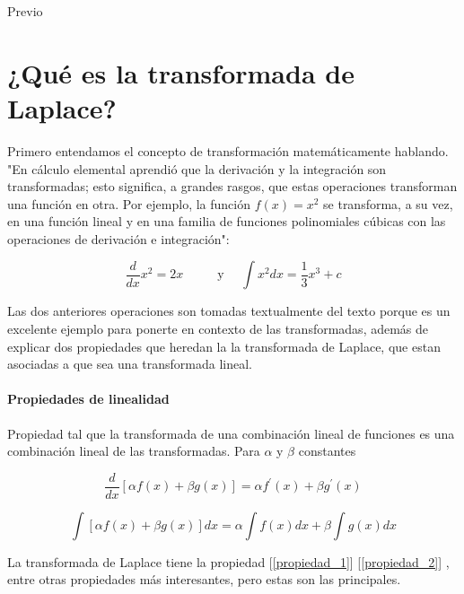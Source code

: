 {\Huge Previo }

\noindent \justifying
\noindent

\section{¿Qué es la transformada de Laplace?}

Primero entendamos el concepto de transformación matemáticamente hablando.
"En cálculo elemental aprendió que la derivación y la integración son transformadas; esto significa, a grandes rasgos, que estas operaciones transforman una función en otra. Por ejemplo, la función $f(x)=x^{2}$ se transforma, a su vez, en una función lineal y en una familia de funciones polinomiales cúbicas con las operaciones de derivación e integración":


\begin{equation}
		\frac{d}{d x} x^{2}=2 x \hspace{1cm}
		\text { y } \quad \int x^{2} d x=\frac{1}{3} x^{3}+c
\end{equation}

Las dos anteriores operaciones son   tomadas textualmente del texto  porque es un excelente ejemplo para ponerte en contexto de las transformadas, además de explicar dos propiedades que heredan la la transformada de Laplace, que estan asociadas a que sea una transformada lineal.

\paragraph*{Propiedades de linealidad}

Propiedad  tal que la transformada de una combinación lineal de funciones es una combinación lineal de las transformadas. Para $\alpha$ y $\beta$ constantes

\begin{equation}
	\frac{d}{d x}[\alpha f(x)+\beta g(x)]=\alpha f^{\prime}(x)+\beta g^{\prime}(x)
	\label{propiedad_1}
\end{equation}

\begin{equation}
	\int[\alpha f(x)+\beta g(x)] d x=\alpha \int f(x) d x+\beta \int g(x) d x
	\label{propiedad_2}
\end{equation}

La transformada de Laplace tiene la propiedad [\ref{propiedad_1}] [\ref{propiedad_2}] , entre otras propiedades más interesantes, pero estas son las principales.


